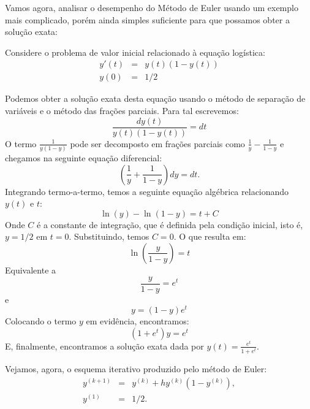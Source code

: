 Vamos agora, analisar o desempenho do Método de Euler usando um exemplo mais complicado, porém ainda simples suficiente para que possamos obter a solução exata:  
\begin{ex}\label{ex_euler_1} Considere o problema de valor inicial relacionado à equação logística:
\begin{eqnarray*}
y'(t)&=&y(t)(1-y(t))\\
y(0)&=&1/2
\end{eqnarray*}
\end{ex}
Podemos obter a solução exata desta equação usando o método de separação de variáveis e o método das frações parciais. Para tal escrevemos:
\begin{equation*}
\frac{dy(t)}{y(t)(1-y(t))}=dt
\end{equation*}
O termo $\frac{1}{y(1-y)}$ pode ser decomposto em frações parciais como $\frac{1}{y}-\frac{1}{1-y}$ e chegamos na seguinte equação diferencial:
\begin{equation*}
\left(\frac{1}{y}+\frac{1}{1-y}\right)dy=dt.
\end{equation*}
Integrando termo-a-termo, temos a seguinte equação algébrica relacionando $y(t)$ e $t$:
\begin{equation*}
\ln(y)-\ln(1-y)=t+C
\end{equation*}
Onde $C$ é a constante de integração, que é definida pela condição inicial, isto é, $y=1/2$ em $t=0$. Substituindo, temos $C=0$. O que resulta em:
\begin{equation*}
\ln\left(\frac{y}{1-y}\right)=t
\end{equation*}
Equivalente a
\begin{equation*}
\frac{y}{1-y}=e^{t}
\end{equation*}
e
\begin{equation*}
y=(1-y)e^{t} 
\end{equation*}
Colocando o termo $y$ em evidência, encontramos:
\begin{equation}
(1+e^t)y=e^{t} 
\end{equation}
E, finalmente, encontramos a solução exata dada por $y(t)=\frac{e^t}{1+e^{t}}$.

Vejamos, agora, o esquema iterativo produzido pelo método de Euler:
\begin{eqnarray*}
y^{(k+1)}&=& y^{(k)}+h y^{(k)}(1-y^{(k)}), \\
y^{(1)}&=& 1/2.
\end{eqnarray*}


